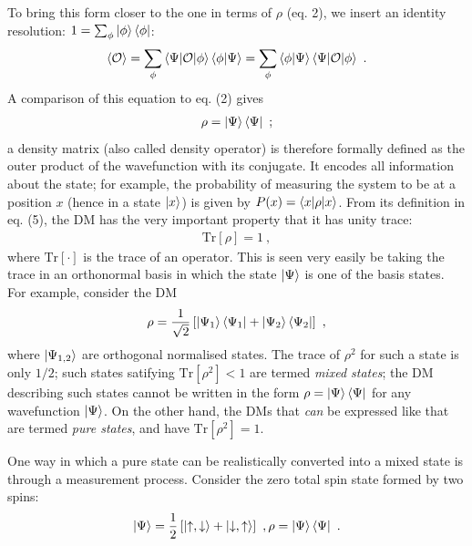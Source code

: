 To bring this form closer to the one in terms of $ \rho $ (eq. 2), we insert an identity resolution: $ 1 = \sum_\phi \ket{\phi}\bra{\phi} $:
\begin{equation}\begin{aligned}
\braket{\mathcal{O}} = \sum_{\phi} \braket{\Psi | \mathcal{O} | \phi}\braket{\phi| \Psi} = \sum_{\phi} \braket{\phi| \Psi}\braket{\Psi | \mathcal{O} | \phi} ~.
\end{aligned}\end{equation}
A comparison of this equation to eq. (2) gives
\begin{equation}\begin{aligned}
\rho = \ket{\Psi}\bra{\Psi} ~;
\end{aligned}\end{equation}
a density matrix (also called density operator) is therefore formally defined as the outer product of the wavefunction with its conjugate. It encodes all information about the state; for example, the probability of measuring the system to be at a position $ x $ (hence in a state $ \ket{x} $) is given by $ P(x) = \braket{x\vert \rho\vert x} $. From its definition in eq. (5), the DM has the very important property that it has unity trace: 
\begin{equation}\begin{aligned}
 \text{Tr}[\rho] = 1 ~,
\end{aligned}\end{equation}
where $ \text{Tr}[\cdot] $ is the trace of an operator. This is seen very easily be taking the trace in an orthonormal basis in which the state $ \ket{\Psi} $ is one of the basis states. For example, consider the DM
\begin{equation}\begin{aligned}
\rho = \frac{1}{\sqrt 2}\left[\ket{\Psi_1}\bra{\Psi_1} + \ket{\Psi_2}\bra{\Psi_2}\right]~,
\end{aligned}\end{equation}
where $\ket{\Psi_{1,2}}$ are orthogonal normalised states. The trace of $ \rho^2 $ for such a state is only $ 1/2 $; such states satifying $ \text{Tr}[\rho^2] < 1 $ are termed {\it mixed states}; the DM describing such states cannot be written in the form $ \rho = \ket{\Psi}\bra{\Psi} $ for any wavefunction $ \ket{\Psi} $. On the other hand, the DMs that {\it can} be expressed like that are termed {\it pure states}, and have $ \text{Tr}[\rho^2] = 1 $.

One way in which a pure state can be realistically converted into a mixed state is through a measurement process. Consider the zero total spin state formed by two spins:
\begin{equation}\begin{aligned}
\ket{\Psi} = \frac{1}{2}\left[\ket{\uparrow,\downarrow} + \ket{\downarrow,\uparrow} \right]~, \rho = \ket{\Psi}\bra{\Psi} ~.
\end{aligned}\end{equation}

